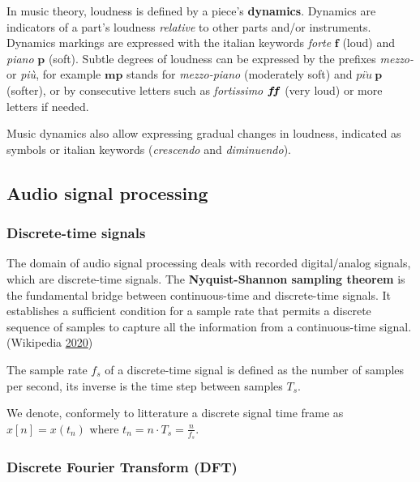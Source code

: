 \documentclass[
  american,
]{article}
\begin{document}
In music theory, loudness is defined by a piece's \textbf{dynamics}.
Dynamics are indicators of a part's loudness \emph{relative}
to other parts and/or instruments.
Dynamics markings are expressed with the italian
keywords \emph{forte} \(\boldsymbol{f}\) (loud) and \emph{piano} \(\boldsymbol{p}\) (soft).
Subtle degrees of loudness can be expressed
by the prefixes \emph{mezzo-} or \emph{più}, for example \(\boldsymbol{mp}\) stands
for \emph{mezzo-piano} (moderately soft) and \(pi\grave{u}~\boldsymbol{p}\) (softer),
or by consecutive letters such as \emph{fortissimo} \(\boldsymbol{f}\hspace{-2pt}\boldsymbol{f}\)
(very loud) or more letters if needed.

Music dynamics also allow expressing gradual changes
in loudness, indicated as symbols or italian keywords
(\emph{crescendo} and \emph{diminuendo}).

\hypertarget{audio-signal-processing}{%
\subsection{Audio signal processing}\label{audio-signal-processing}}

\hypertarget{discrete-time-signals}{%
\subsubsection{Discrete-time signals}\label{discrete-time-signals}}

The domain of audio signal processing deals with recorded
digital/analog signals, which are discrete-time signals.
The \textbf{Nyquist-Shannon sampling theorem} is the fundamental
bridge between continuous-time and discrete-time signals.
It establishes a sufficient condition for a sample rate
that permits a discrete sequence of samples to capture
all the information from a continuous-time signal.
(Wikipedia \protect\hyperlink{ref-wiki:nyquistshannon}{2020})

The sample rate \(f_s\) of a discrete-time signal
is defined as the number of samples per second,
its inverse is the time step between samples \(T_s\).

We denote, conformely to litterature a discrete signal
time frame as \(x[n]=x(t_n)\) where
\(t_n=n\cdot T_s=\frac{n}{f_s}\).

\hypertarget{discrete-fourier-transform-dft}{%
\subsubsection{Discrete Fourier Transform (DFT)}\label{discrete-fourier-transform-dft}}
\end{document}
